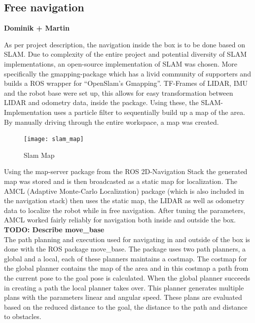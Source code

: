     \subsection{Free navigation} %
    \label{sub:mr_free_navigation}

    \textbf{Dominik + Martin}
    
    As per project description, the navigation inside the box is to be done based on SLAM. 
    Due to complexity of the entire project and potential diversity of SLAM implementations, an open-source implementation of SLAM was chosen. 
    More specifically the gmapping-package \cite{gmapping} which has a livid community of supporters and builds a ROS wrapper for “OpenSlam's Gmapping”\cite{openslam}. 
    TF-Frames of LIDAR, IMU and the robot base were set up, this allows for easy transformation between LIDAR and odometry data, inside the package. 
    Using these, the SLAM-Implementation uses a particle filter to sequentially build up a map of the area. 
    By manually driving through the entire workspace, a map was created. 
    \begin{figure}[H]
        \centering
        \texttt{[image: slam\_map]}
        \caption{Slam Map}
        \label{fig:slam_map}
    \end{figure}
    Using the map-server package from the ROS 2D-Navigation Stack \cite{navigation_stack} the generated map was stored and is then broadcasted as a static map for localization. 
    The AMCL (Adaptive Monte-Carlo Localization) package (which is also included in the navigation stack) then uses the static map, the LIDAR as well as odometry data to localize the robot while in free navigation. 
    After tuning the parameters, AMCL worked fairly reliably for navigation both inside and outside the box.\\
    \textbf{TODO: Describe move{\_}base}\\
	The path planning and execution used for navigating in and outside of the box is done with the ROS package move{\_}base. The package uses two path planners, a global and a local, each of these planners maintains a costmap. The costmap for the global planner contains the map of the area and in this costmap a path from the current pose to the goal pose is calculated. When the global planner succeeds in creating a path the local planner takes over. This planner generates multiple plans with the parameters linear and angular speed. These plans are evaluated based on the reduced distance to the goal, the distance to the path and distance to obstacles. \\
